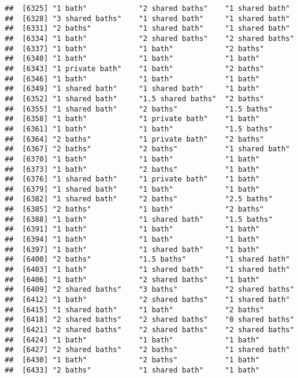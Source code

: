 \documentclass[
]{article}
\begin{document}
\begin{verbatim}
##  [6325] "1 bath"            "2 shared baths"    "1 shared bath"    
##  [6328] "3 shared baths"    "1 shared bath"     "1 shared bath"    
##  [6331] "2 baths"           "1 shared bath"     "1 shared bath"    
##  [6334] "1 bath"            "2 shared baths"    "2 shared baths"   
##  [6337] "1 bath"            "1 bath"            "2 baths"          
##  [6340] "1 bath"            "1 bath"            "1 bath"           
##  [6343] "1 private bath"    "1 bath"            "2 baths"          
##  [6346] "1 bath"            "1 bath"            "1 bath"           
##  [6349] "1 shared bath"     "1 shared bath"     "1 bath"           
##  [6352] "1 shared bath"     "1.5 shared baths"  "2 baths"          
##  [6355] "1 shared bath"     "2 baths"           "1.5 baths"        
##  [6358] "1 bath"            "1 private bath"    "1 bath"           
##  [6361] "1 bath"            "1 bath"            "1.5 baths"        
##  [6364] "2 baths"           "1 private bath"    "2 baths"          
##  [6367] "2 baths"           "2 baths"           "1 shared bath"    
##  [6370] "1 bath"            "1 bath"            "1 bath"           
##  [6373] "1 bath"            "2 baths"           "1 bath"           
##  [6376] "1 shared bath"     "1 private bath"    "1 bath"           
##  [6379] "1 shared bath"     "1 bath"            "1 bath"           
##  [6382] "1 shared bath"     "2 baths"           "2.5 baths"        
##  [6385] "2 baths"           "1 bath"            "2 baths"          
##  [6388] "1 bath"            "1 shared bath"     "1.5 baths"        
##  [6391] "1 bath"            "1 bath"            "1 bath"           
##  [6394] "1 bath"            "1 bath"            "1 bath"           
##  [6397] "1 bath"            "1 shared bath"     "1 bath"           
##  [6400] "2 baths"           "1.5 baths"         "1 shared bath"    
##  [6403] "1 bath"            "1 shared bath"     "1 shared bath"    
##  [6406] "1 bath"            "2 shared baths"    "1 bath"           
##  [6409] "2 shared baths"    "3 baths"           "2 shared baths"   
##  [6412] "1 bath"            "2 shared baths"    "1 shared bath"    
##  [6415] "1 shared bath"     "1 bath"            "2 baths"          
##  [6418] "2 shared baths"    "2 shared baths"    "0 shared baths"   
##  [6421] "2 shared baths"    "2 shared baths"    "2 shared baths"   
##  [6424] "1 bath"            "1 bath"            "1 bath"           
##  [6427] "2 shared baths"    "2 baths"           "1 shared bath"    
##  [6430] "1 bath"            "2 baths"           "1 bath"           
##  [6433] "2 baths"           "1 shared bath"     "1 bath"           

\end{verbatim}
\end{document}
